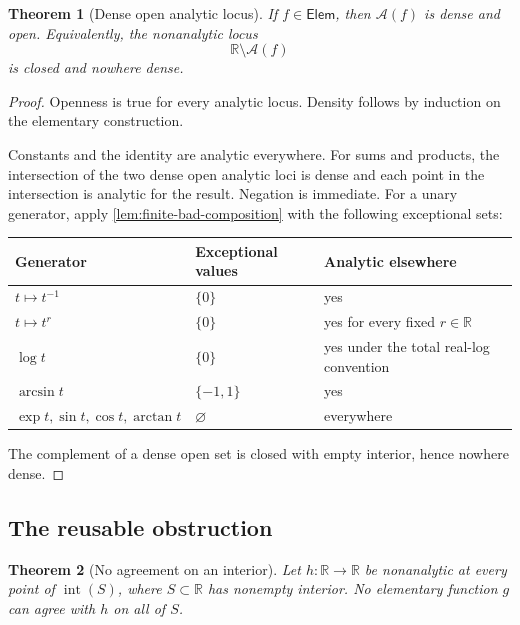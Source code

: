 \documentclass[11pt,oneside]{article}
\newtheorem{theorem}{Theorem}[section]
\theoremstyle{definition}
\theoremstyle{remark}
\newcommand{\R}{\mathbb R}
\newcommand{\anloc}{\mathcal A}
\newcommand{\interior}{\operatorname{int}}
\begin{document}
\begin{theorem}[Dense open analytic locus]
\label{thm:elementary-dense-analytic}
If $f\in\mathsf{Elem}$, then $\anloc(f)$ is dense and open.  Equivalently, the nonanalytic
locus
\begin{equation}
 \R\setminus\anloc(f)
 \label{eq:elementary-exceptional-set}
\end{equation}
is closed and nowhere dense.
\end{theorem}

\begin{proof}
Openness is true for every analytic locus.  Density follows by induction on the elementary
construction.

Constants and the identity are analytic everywhere.  For sums and products, the
intersection of the two dense open analytic loci is dense and each point in the intersection
is analytic for the result.  Negation is immediate.  For a unary generator, apply
\cref{lem:finite-bad-composition} with the following exceptional sets:
\begin{center}
\begin{tabular}{@{}lll@{}}
\toprule
Generator & Exceptional values & Analytic elsewhere\\
\midrule
$t\mapsto t^{-1}$ & $\{0\}$ & yes\\
$t\mapsto t^r$ & $\{0\}$ & yes for every fixed $r\in\R$\\
$\log t$ & $\{0\}$ & yes under the total real-log convention\\
$\arcsin t$ & $\{-1,1\}$ & yes\\
$\exp t,\sin t,\cos t,\arctan t$ & $\varnothing$ & everywhere\\
\bottomrule
\end{tabular}
\end{center}
The complement of a dense open set is closed with empty interior, hence nowhere dense.
\end{proof}

\subsection{The reusable obstruction}

\begin{theorem}[No agreement on an interior]
\label{thm:elementary-obstruction}
Let $h:\R\to\R$ be nonanalytic at every point of $\interior(S)$, where
$S\subset\R$ has nonempty interior.  No elementary function $g$ can agree with $h$ on all of
$S$.
\end{theorem}
\end{document}
